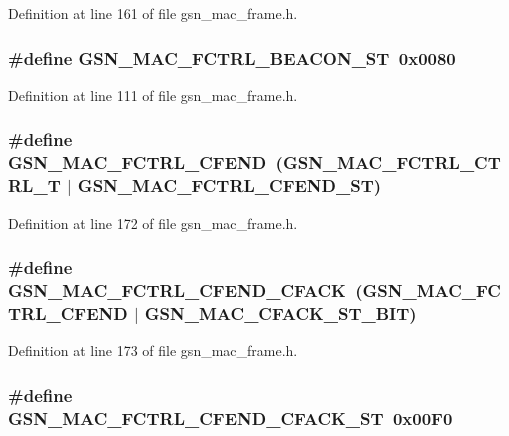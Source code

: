 Definition at line 161 of file gsn\_\-mac\_\-frame.h.

\hypertarget{a00523_a7128e7dee71ef2876860fb31a8575620}{
\subsubsection[{GSN\_\-MAC\_\-FCTRL\_\-BEACON\_\-ST}]{\setlength{\rightskip}{0pt plus 5cm}\#define GSN\_\-MAC\_\-FCTRL\_\-BEACON\_\-ST~0x0080}}
\label{a00523_a7128e7dee71ef2876860fb31a8575620}


Definition at line 111 of file gsn\_\-mac\_\-frame.h.

\hypertarget{a00523_a62200880bced535be7cb6c27175d42a4}{
\subsubsection[{GSN\_\-MAC\_\-FCTRL\_\-CFEND}]{\setlength{\rightskip}{0pt plus 5cm}\#define GSN\_\-MAC\_\-FCTRL\_\-CFEND~(GSN\_\-MAC\_\-FCTRL\_\-CTRL\_\-T    $|$ GSN\_\-MAC\_\-FCTRL\_\-CFEND\_\-ST)}}
\label{a00523_a62200880bced535be7cb6c27175d42a4}


Definition at line 172 of file gsn\_\-mac\_\-frame.h.

\hypertarget{a00523_a140e74f226cbcdad957aebdb7c74a143}{
\subsubsection[{GSN\_\-MAC\_\-FCTRL\_\-CFEND\_\-CFACK}]{\setlength{\rightskip}{0pt plus 5cm}\#define GSN\_\-MAC\_\-FCTRL\_\-CFEND\_\-CFACK~(GSN\_\-MAC\_\-FCTRL\_\-CFEND     $|$ GSN\_\-MAC\_\-CFACK\_\-ST\_\-BIT)}}
\label{a00523_a140e74f226cbcdad957aebdb7c74a143}


Definition at line 173 of file gsn\_\-mac\_\-frame.h.

\hypertarget{a00523_a51d3bbb0291d2702705582f0a62aa47f}{
\subsubsection[{GSN\_\-MAC\_\-FCTRL\_\-CFEND\_\-CFACK\_\-ST}]{\setlength{\rightskip}{0pt plus 5cm}\#define GSN\_\-MAC\_\-FCTRL\_\-CFEND\_\-CFACK\_\-ST~0x00F0}}
\label{a00523_a51d3bbb0291d2702705582f0a62aa47f}


